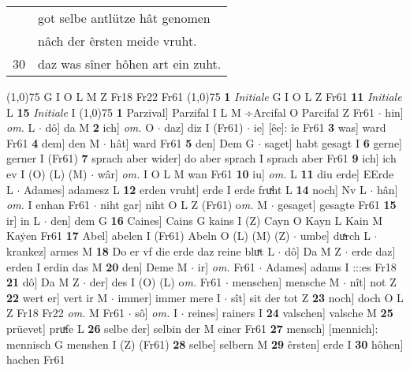 \documentclass[8pt,a4paper,notitlepage]{article}
\begin{document}
\begin{table}[ht]
\begin{minipage}[t]{0.5\linewidth}
\begin{tabular}{rl}
 & got selbe antlütze hât genomen\\ 
 & nâch der êrsten meide vruht.\\ 
30 & daz was sîner hôhen art ein zuht.\\ 
\end{tabular}
\scriptsize
\line(1,0){75} \newline
G I O L M Z Fr18 Fr22 Fr61 \newline
\line(1,0){75} \newline
\textbf{1} \textit{Initiale} G I O L Z Fr61  \textbf{11} \textit{Initiale} L  \textbf{15} \textit{Initiale} I  \newline
\line(1,0){75} \newline
\textbf{1} Parzival] Parzifal I L M ÷Arcifal O Parcifal Z Fr61  $\cdot$ hin] \textit{om.} L  $\cdot$ dô] da M \textbf{2} ich] \textit{om.} O  $\cdot$ daz] diz I (Fr61)  $\cdot$ ie] [êe]: îe Fr61 \textbf{3} was] ward Fr61 \textbf{4} dem] den M  $\cdot$ hât] ward Fr61 \textbf{5} den] Dem G  $\cdot$ saget] habt gesagt I \textbf{6} gerne] gerner I (Fr61) \textbf{7} sprach aber wider] do aber sprach I sprach aber Fr61 \textbf{9} ich] ich ev I (O) (L) (M)  $\cdot$ wâr] \textit{om.} I O L M wan Fr61 \textbf{10} iu] \textit{om.} L \textbf{11} diu erde] EErde L  $\cdot$ Adames] adamesz L \textbf{12} erden vruht] erde I erde fruͯht L \textbf{14} noch] Nv L  $\cdot$ hân] \textit{om.} I enhan Fr61  $\cdot$ niht gar] niht O L Z (Fr61) o\textit{m. } M  $\cdot$ gesaget] gesagte Fr61 \textbf{15} ir] in L  $\cdot$ den] dem G \textbf{16} Caines] Cains G kains I (Z) Cayn O Kayn L Kain M Kaẏen Fr61 \textbf{17} Abel] abelen I (Fr61) Abeln O (L) (M) (Z)  $\cdot$ umbe] duͯrch L  $\cdot$ krankez] armes M \textbf{18} Do er vf die erde daz reine bluͯt L  $\cdot$ dô] Da M Z  $\cdot$ erde daz] erden I erdin das M \textbf{20} den] Deme M  $\cdot$ ir] \textit{om.} Fr61  $\cdot$ Adames] adams I :::es Fr18 \textbf{21} dô] Da M Z  $\cdot$ der] des I (O) (L) o\textit{m. } Fr61  $\cdot$ menschen] mensche M  $\cdot$ nît] not Z \textbf{22} wert er] vert ir M  $\cdot$ immer] immer mere I  $\cdot$ sît] sit der tot Z \textbf{23} noch] doch O L Z Fr18 Fr22 \textit{om.} M Fr61  $\cdot$ sô] \textit{om.} I  $\cdot$ reines] rainers I \textbf{24} valschen] valsche M \textbf{25} prüevet] pruͯfe L \textbf{26} selbe der] selbin der M einer Fr61 \textbf{27} mensch] [mennich]: mennisch G menshen I (Z) (Fr61) \textbf{28} selbe] selbern M \textbf{29} êrsten] erde I \textbf{30} hôhen] hachen Fr61 \newline
\end{minipage}

\end{table}
\end{document}

